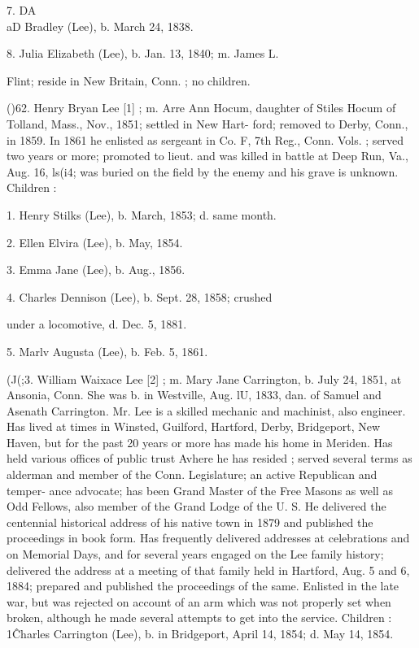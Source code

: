 \documentclass{book}
\begin{document}
7. DA\\aD Bradley (Lee), b. March 24, 1838. 

8. Julia Elizabeth (Lee), b. Jan. 13, 1840; m. James L. 

Flint; reside in New Britain, Conn. ; no children. 

()62. Henry Bryan Lee [1] ; m. Arre Ann Hocum, daughter of Stiles 
Hocum of Tolland, Mass., Nov., 1851; settled in New Hart- 
ford; removed to Derby, Conn., in 1859. In 1861 he enlisted 
as sergeant in Co. F, 7th Reg., Conn. Vols. ; served two years 
or more; promoted to lieut. and was killed in battle at Deep 
Run, Va., Aug. 16, ls(i4; was buried on the field by the enemy 
and his grave is unknown. Children : 

1. Henry Stilks (Lee), b. March, 1853; d. same month. 

2. Ellen Elvira (Lee), b. May, 1854. 

3. Emma Jane (Lee), b. Aug., 1856. 




4. Charles Dennison (Lee), b. Sept. 28, 1858; crushed 

under a locomotive, d. Dec. 5, 1881. 

5. Marlv Augusta (Lee), b. Feb. 5, 1861. 

(J(;3. William Waixace Lee [2] ; m. Mary Jane Carrington, b. July 
24, 1851, at Ansonia, Conn. She was b. in Westville, Aug. lU, 
1833, dan. of Samuel and Asenath Carrington. Mr. Lee is a 
skilled mechanic and machinist, also engineer. Has lived at 
times in Winsted, Guilford, Hartford, Derby, Bridgeport, New 
Haven, but for the past 20 years or more has made his home in 
Meriden. Has held various offices of public trust Avhere he 
has resided ; served several terms as alderman and member 
of the Conn. Legislature; an active Republican and temper- 
ance advocate; has been Grand Master of the Free Masons 
as well as Odd Fellows, also member of the Grand Lodge of 
the U. S. He delivered the centennial historical address of 
his native town in 1879 and published the proceedings in book 
form. Has frequently delivered addresses at celebrations and 
on Memorial Days, and for several years engaged on the Lee 
family history; delivered the address at a meeting of that 
family held in Hartford, Aug. 5 and 6, 1884; prepared and 
published the proceedings of the same. Enlisted in the late 
war, but was rejected on account of an arm which was not 
properly set when broken, although he made several attempts 
to get into the service. Children : 
1\^ Charles Carrington (Lee), b. in Bridgeport, April 14, 
1854; d. May 14, 1854. 
\end{document}
